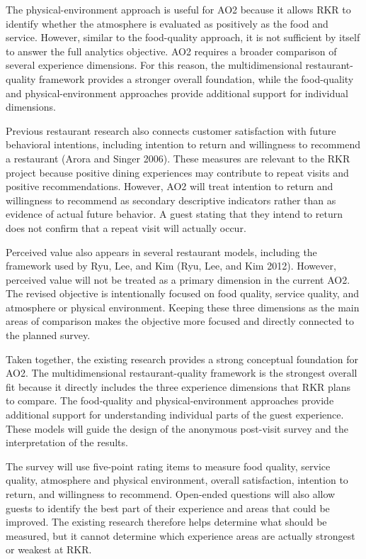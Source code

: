 \documentclass[
  12pt,
  letterpaper,
  DIV=11,
  numbers=noendperiod]{scrartcl}
\begin{document}
The physical-environment approach is useful for AO2 because it allows
RKR to identify whether the atmosphere is evaluated as positively as the
food and service. However, similar to the food-quality approach, it is
not sufficient by itself to answer the full analytics objective. AO2
requires a broader comparison of several experience dimensions. For this
reason, the multidimensional restaurant-quality framework provides a
stronger overall foundation, while the food-quality and
physical-environment approaches provide additional support for
individual dimensions.

Previous restaurant research also connects customer satisfaction with
future behavioral intentions, including intention to return and
willingness to recommend a restaurant (Arora and Singer 2006). These
measures are relevant to the RKR project because positive dining
experiences may contribute to repeat visits and positive
recommendations. However, AO2 will treat intention to return and
willingness to recommend as secondary descriptive indicators rather than
as evidence of actual future behavior. A guest stating that they intend
to return does not confirm that a repeat visit will actually occur.

Perceived value also appears in several restaurant models, including the
framework used by Ryu, Lee, and Kim (Ryu, Lee, and Kim 2012). However,
perceived value will not be treated as a primary dimension in the
current AO2. The revised objective is intentionally focused on food
quality, service quality, and atmosphere or physical environment.
Keeping these three dimensions as the main areas of comparison makes the
objective more focused and directly connected to the planned survey.

Taken together, the existing research provides a strong conceptual
foundation for AO2. The multidimensional restaurant-quality framework is
the strongest overall fit because it directly includes the three
experience dimensions that RKR plans to compare. The food-quality and
physical-environment approaches provide additional support for
understanding individual parts of the guest experience. These models
will guide the design of the anonymous post-visit survey and the
interpretation of the results.

The survey will use five-point rating items to measure food quality,
service quality, atmosphere and physical environment, overall
satisfaction, intention to return, and willingness to recommend.
Open-ended questions will also allow guests to identify the best part of
their experience and areas that could be improved. The existing research
therefore helps determine what should be measured, but it cannot
determine which experience areas are actually strongest or weakest at
RKR.
\end{document}
